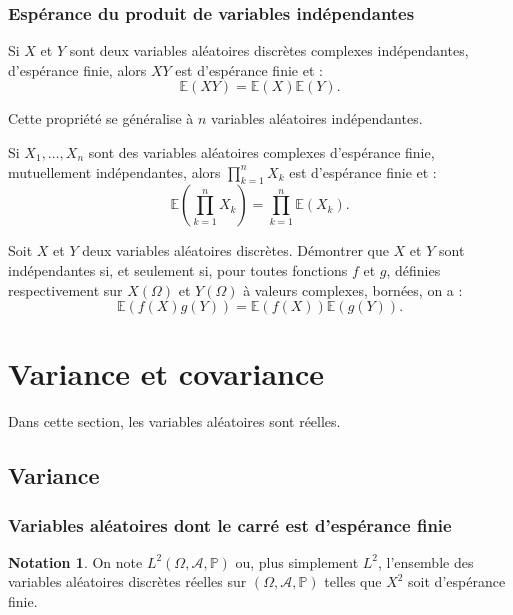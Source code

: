 \documentclass[french]{article}
\renewcommand{\P}{\mathbb{P}}
\newcommand{\E}{\mathbb{E}}
\theoremstyle{plain}
\theoremstyle{definition}
\newtheorem*{notation}{Notation}
\theoremstyle{remark}
\begin{document}
\subsubsection*{Espérance du produit de variables indépendantes}

\begin{thm}%
	Si $X$ et $Y$ sont deux variables aléatoires discrètes complexes indépendantes, d'espérance finie, alors $XY$ est d'espérance finie et : 
	$$\E(XY)=\E(X)\E(Y).$$
\end{thm}

Cette propriété se généralise à $n$ variables aléatoires indépendantes.

\begin{cor}%
	Si $X_1,\ldots,X_n$ sont des variables aléatoires complexes d'espérance finie, mutuellement indépendantes, alors $\displaystyle\prod_{k=1}^{n}X_k$ est d'espérance finie et :
	$$\E\left(\prod_{k=1}^{n}X_k\right)=\prod_{k=1}^{n}\E(X_k).$$
\end{cor}

\begin{exo}
	Soit $X$ et $Y$ deux variables aléatoires discrètes. Démontrer que $X$ et $Y$ sont indépendantes si, et seulement si, pour toutes fonctions $f$ et $g$, définies respectivement sur $X(\Omega)$ et $Y(\Omega)$ à valeurs complexes, bornées, on a :
	$$\E(f(X)g(Y))=\E(f(X))\E(g(Y)).$$
\end{exo}

\section{Variance et covariance}

Dans cette section, les variables aléatoires sont réelles.

\subsection{Variance}

\subsubsection*{Variables aléatoires dont le carré est d'espérance finie}

\begin{notation}
	On note $L^2(\Omega,\mathcal{A},\P)$ ou, plus simplement $L^2$, l'ensemble des variables aléatoires discrètes réelles sur $(\Omega,\mathcal{A},\P)$ telles que $X^2$ soit d'espérance finie.
\end{notation}
\end{document}
